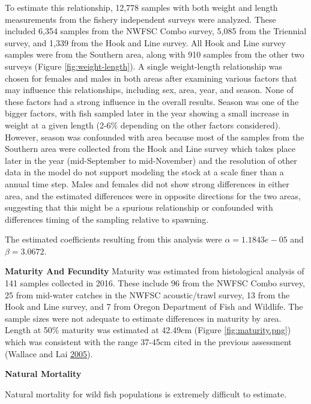 \documentclass[12pt,]{article}
\begin{document}
To estimate this relationship, 12,778 samples with both weight and
length measurements from the fishery independent surveys were analyzed.
These included 6,354 samples from the NWFSC Combo survey, 5,085 from the
Triennial survey, and 1,339 from the Hook and Line survey. All Hook and
Line survey samples were from the Southern area, along with 910 samples
from the other two surveys (Figure \ref{fig:weight-length}). A single
weight-length relationship was chosen for females and males in both
areas after examining various factors that may influence this
relationships, including sex, area, year, and season. None of these
factors had a strong influence in the overall results. Season was one of
the bigger factors, with fish sampled later in the year showing a small
increase in weight at a given length (2-6\% depending on the other
factors considered). However, season was confounded with area because
most of the samples from the Southern area were collected from the Hook
and Line survey which takes place later in the year (mid-September to
mid-November) and the resolution of other data in the model do not
support modeling the stock at a scale finer than a annual time step.
Males and females did not show strong differences in either area, and
the estimated differences were in opposite directions for the two areas,
suggesting that this might be a spurious relationship or confounded with
differences timing of the sampling relative to spawning.

The estimated coefficients resulting from this analysis were
\(\alpha = 1.1843e-05\) and \(\beta = 3.0672\).

\vspace{.5cm}

\textbf{Maturity And Fecundity} Maturity was estimated from histological
analysis of 141 samples collected in 2016. These include 96 from the
NWFSC Combo survey, 25 from mid-water catches in the NWFSC
acoustic/trawl survey, 13 from the Hook and Line survey, and 7 from
Oregon Department of Fish and Wildlife. The sample sizes were not
adequate to estimate differences in maturity by area. Length at 50\%
maturity was estimated at 42.49cm (Figure \ref{fig:maturity.png}) which
was consistent with the range 37-45cm cited in the previous assessment
(Wallace and Lai \protect\hyperlink{ref-Wallace2005}{2005}).

\vspace{.5cm}

\textbf{Natural Mortality}

Natural mortality for wild fish populations is extremely difficult to
estimate.
\end{document}
